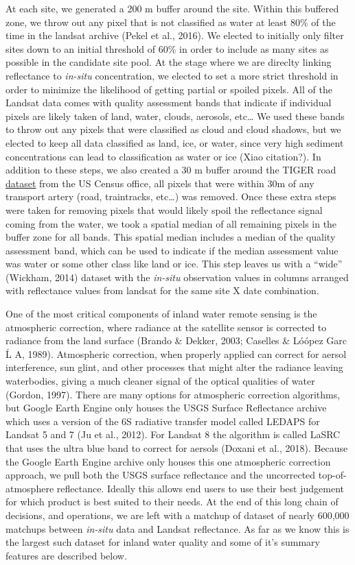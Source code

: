 \documentclass[]{article}
\begin{document}
At each site, we generated a 200 m buffer around the site. Within this
buffered zone, we throw out any pixel that is not classified as water at
least 80\% of the time in the landsat archive (Pekel et al., 2016). We
elected to initially only filter sites down to an initial threshold of
60\% in order to include as many sites as possible in the candidate site
pool. At the stage where we are direclty linking reflectance to
\emph{in-situ} concentration, we elected to set a more strict threshold
in order to minimize the likelihood of getting partial or spoiled
pixels. All of the Landsat data comes with quality assessment bands that
indicate if individual pixels are likely taken of land, water, clouds,
aerosols, etc\ldots{} We used these bands to throw out any pixels that
were classified as cloud and cloud shadows, but we elected to keep all
data classified as land, ice, or water, since very high sediment
concentrations can lead to classification as water or ice (Xiao
citation?). In addition to these steps, we also created a 30 m buffer
around the TIGER road
\href{https://www.census.gov/geo/maps-data/data/tiger.html}{dataset}
from the US Census office, all pixels that were within 30m of any
transport artery (road, traintracks, etc\ldots{}) was removed. Once
these extra steps were taken for removing pixels that would likely spoil
the reflectance signal coming from the water, we took a spatial median
of all remaining pixels in the buffer zone for all bands. This spatial
median includes a median of the quality assessment band, which can be
used to indicate if the median assessment value was water or some other
class like land or ice. This step leaves us with a ``wide'' (Wickham,
2014) dataset with the \emph{in-situ} observation values in columns
arranged with reflectance values from landsat for the same site X date
combination.

One of the most critical components of inland water remote sensing is
the atmospheric correction, where radiance at the satellite sensor is
corrected to radiance from the land surface (Brando \& Dekker, 2003;
Caselles \& Lóópez Garc Ĺ A, 1989). Atmospheric correction, when
properly applied can correct for aersol interference, sun glint, and
other processes that might alter the radiance leaving waterbodies,
giving a much cleaner signal of the optical qualities of water (Gordon,
1997). There are many options for atmospheric correction algorithms, but
Google Earth Engine only houses the USGS Surface Reflectance archive
which uses a version of the 6S radiative transfer model called LEDAPS
for Landsat 5 and 7 (Ju et al., 2012). For Landsat 8 the algorithm is
called LaSRC that uses the ultra blue band to correct for aersols
(Doxani et al., 2018). Because the Google Earth Engine archive only
houses this one atmospheric correction approach, we pull both the USGS
surface reflectance and the uncorrected top-of-atmosphere reflectance.
Ideally this allows end users to use their best judgement for which
product is best suited to their needs. At the end of this long chain of
decisions, and operations, we are left with a matchup of dataset of
nearly 600,000 matchups between \emph{in-situ} data and Landsat
reflectance. As far as we know this is the largest such dataset for
inland water quality and some of it's summary features are described
below.
\end{document}
